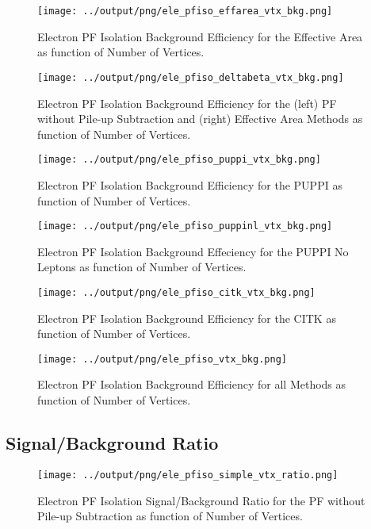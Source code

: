 \documentclass[11pt]{book}
\begin{document}
\begin{figure}[htb]
\centering
\texttt{[image: ../output/png/ele\_pfiso\_effarea\_vtx\_bkg.png]}
\caption{Electron PF Isolation Background Efficiency for the Effective Area as function of Number of Vertices.}
\label{fig:ele_pfiso_vtx_bkg_effarea}
\end{figure}

\begin{figure}[htb]
\centering
\texttt{[image: ../output/png/ele\_pfiso\_deltabeta\_vtx\_bkg.png]}
\caption{Electron PF Isolation Background Efficiency for the (left) PF without Pile-up Subtraction and (right) Effective Area Methods as function of Number of Vertices.}
\label{fig:ele_pfiso_vtx_bkg_deltabeta}
\end{figure}

\begin{figure}[htb]
\centering
\texttt{[image: ../output/png/ele\_pfiso\_puppi\_vtx\_bkg.png]}
\caption{Electron PF Isolation Background Efficiency for the PUPPI as function of Number of Vertices.}
\label{fig:ele_pfiso_vtx_bgk_puppi}
\end{figure}

\begin{figure}[htb]
\centering
\texttt{[image: ../output/png/ele\_pfiso\_puppinl\_vtx\_bkg.png]}
\caption{Electron PF Isolation Background Effeciency for the PUPPI No Leptons as function of Number of Vertices.}
\label{fig:ele_pfiso_vtx_bkg_puppinl}
\end{figure}

\begin{figure}[htb]
\centering
\texttt{[image: ../output/png/ele\_pfiso\_citk\_vtx\_bkg.png]}
\caption{Electron PF Isolation Background Efficiency for the CITK as function of Number of Vertices.}
\label{fig:ele_pfiso_vtx_bkg_citk}
\end{figure}

\begin{figure}[htb]
\centering
\texttt{[image: ../output/png/ele\_pfiso\_vtx\_bkg.png]}
\caption{Electron PF Isolation Background Efficiency for all Methods as function of Number of Vertices.}
\label{fig:ele_pfiso_vtx_bkg}
\end{figure}
\clearpage

\subsection{Signal/Background Ratio}
\begin{figure}[htb]
\centering
\texttt{[image: ../output/png/ele\_pfiso\_simple\_vtx\_ratio.png]}
\caption{Electron PF Isolation Signal/Background Ratio for the PF without Pile-up Subtraction as function of Number of Vertices.}
\label{fig:ele_pfiso_vtx_ratio_simple}
\end{figure}
\end{document}

